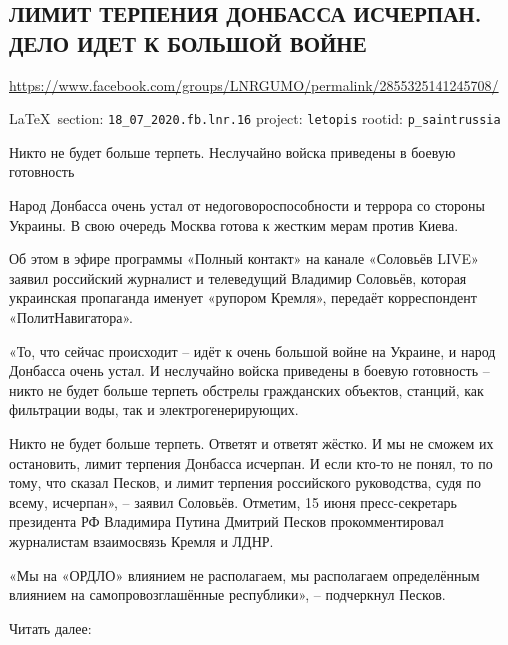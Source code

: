  
 

\subsection{ЛИМИТ ТЕРПЕНИЯ ДОНБАССА ИСЧЕРПАН. ДЕЛО ИДЕТ К БОЛЬШОЙ ВОЙНЕ}
\url{https://www.facebook.com/groups/LNRGUMO/permalink/2855325141245708/}
  
\vspace{0.5cm}
{\small\LaTeX~section: \verb|18_07_2020.fb.lnr.16| project: \verb|letopis| rootid: \verb|p_saintrussia|}
\vspace{0.5cm}

Никто не будет больше терпеть. Неслучайно войска приведены в боевую готовность

Народ Донбасса очень устал от недоговороспособности и террора со стороны Украины.
В свою очередь Москва готова к жестким мерам против Киева.

Об этом в эфире программы «Полный контакт» на канале «Соловьёв LIVE» заявил российский журналист и телеведущий Владимир Соловьёв, которая украинская пропаганда именует «рупором Кремля», передаёт корреспондент «ПолитНавигатора».

«То, что сейчас происходит – идёт к очень большой войне на Украине, и народ Донбасса очень устал.
И неслучайно войска приведены в боевую готовность – никто не будет больше терпеть обстрелы гражданских объектов, станций, как фильтрации воды, так и электрогенерирующих.

Никто не будет больше терпеть. Ответят и ответят жёстко.
И мы не сможем их остановить, лимит терпения Донбасса исчерпан.
И если кто-то не понял, то по тому, что сказал Песков, и лимит терпения российского руководства, судя по всему, исчерпан», – заявил Соловьёв.
Отметим, 15 июня пресс-секретарь президента РФ Владимира Путина Дмитрий Песков прокомментировал журналистам взаимосвязь Кремля и ЛДНР.

«Мы на «ОРДЛО» влиянием не располагаем, мы располагаем определённым влиянием на самопровозглашённые республики», – подчеркнул Песков.

Читать далее:  
